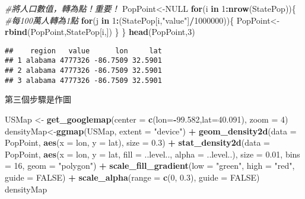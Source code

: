 \documentclass[
]{book}
\newenvironment{Shaded}{\begin{snugshade}}{\end{snugshade}}
\newcommand{\CommentTok}[1]{\textcolor[rgb]{0.56,0.35,0.01}{\textit{#1}}}
\newcommand{\ControlFlowTok}[1]{\textcolor[rgb]{0.13,0.29,0.53}{\textbf{#1}}}
\newcommand{\DataTypeTok}[1]{\textcolor[rgb]{0.13,0.29,0.53}{#1}}
\newcommand{\DecValTok}[1]{\textcolor[rgb]{0.00,0.00,0.81}{#1}}
\newcommand{\FloatTok}[1]{\textcolor[rgb]{0.00,0.00,0.81}{#1}}
\newcommand{\KeywordTok}[1]{\textcolor[rgb]{0.13,0.29,0.53}{\textbf{#1}}}
\newcommand{\NormalTok}[1]{#1}
\newcommand{\OperatorTok}[1]{\textcolor[rgb]{0.81,0.36,0.00}{\textbf{#1}}}
\newcommand{\OtherTok}[1]{\textcolor[rgb]{0.56,0.35,0.01}{#1}}
\newcommand{\StringTok}[1]{\textcolor[rgb]{0.31,0.60,0.02}{#1}}
\begin{document}
\begin{Shaded}
\begin{Highlighting}[]
\CommentTok{#將人口數值，轉為點！重要！}
\NormalTok{PopPoint<-}\OtherTok{NULL} 
\ControlFlowTok{for}\NormalTok{(i }\ControlFlowTok{in} \DecValTok{1}\OperatorTok{:}\KeywordTok{nrow}\NormalTok{(StatePop))\{}
    \CommentTok{#每100萬人轉為1點}
    \ControlFlowTok{for}\NormalTok{(j }\ControlFlowTok{in} \DecValTok{1}\OperatorTok{:}\NormalTok{(StatePop[i,}\StringTok{"value"}\NormalTok{]}\OperatorTok{/}\DecValTok{1000000}\NormalTok{))\{}
\NormalTok{        PopPoint<-}\KeywordTok{rbind}\NormalTok{(PopPoint,StatePop[i,])   }
\NormalTok{    \}}
\NormalTok{\}}
\KeywordTok{head}\NormalTok{(PopPoint,}\DecValTok{3}\NormalTok{)}
\end{Highlighting}
\end{Shaded}

\begin{verbatim}
##    region   value      lon     lat
## 1 alabama 4777326 -86.7509 32.5901
## 2 alabama 4777326 -86.7509 32.5901
## 3 alabama 4777326 -86.7509 32.5901
\end{verbatim}

第三個步驟是作圖

\begin{Shaded}
\begin{Highlighting}[]
\NormalTok{USMap <-}\StringTok{ }\KeywordTok{get_googlemap}\NormalTok{(}\DataTypeTok{center =} \KeywordTok{c}\NormalTok{(}\DataTypeTok{lon=}\OperatorTok{-}\FloatTok{99.582}\NormalTok{,}\DataTypeTok{lat=}\FloatTok{40.091}\NormalTok{), }\DataTypeTok{zoom =} \DecValTok{4}\NormalTok{)}
\NormalTok{densityMap<-}\KeywordTok{ggmap}\NormalTok{(USMap, }\DataTypeTok{extent =} \StringTok{"device"}\NormalTok{) }\OperatorTok{+}\StringTok{ }
\StringTok{    }\KeywordTok{geom_density2d}\NormalTok{(}\DataTypeTok{data =}\NormalTok{ PopPoint, }\KeywordTok{aes}\NormalTok{(}\DataTypeTok{x =}\NormalTok{ lon, }\DataTypeTok{y =}\NormalTok{ lat), }\DataTypeTok{size =} \FloatTok{0.3}\NormalTok{) }\OperatorTok{+}\StringTok{ }
\StringTok{    }\KeywordTok{stat_density2d}\NormalTok{(}\DataTypeTok{data =}\NormalTok{ PopPoint, }
            \KeywordTok{aes}\NormalTok{(}\DataTypeTok{x =}\NormalTok{ lon, }\DataTypeTok{y =}\NormalTok{ lat, }\DataTypeTok{fill =}\NormalTok{ ..level.., }\DataTypeTok{alpha =}\NormalTok{ ..level..), }
                \DataTypeTok{size =} \FloatTok{0.01}\NormalTok{, }\DataTypeTok{bins =} \DecValTok{16}\NormalTok{, }\DataTypeTok{geom =} \StringTok{"polygon"}\NormalTok{) }\OperatorTok{+}\StringTok{ }
\StringTok{    }\KeywordTok{scale_fill_gradient}\NormalTok{(}\DataTypeTok{low =} \StringTok{"green"}\NormalTok{, }\DataTypeTok{high =} \StringTok{"red"}\NormalTok{, }\DataTypeTok{guide =} \OtherTok{FALSE}\NormalTok{) }\OperatorTok{+}\StringTok{ }
\StringTok{    }\KeywordTok{scale_alpha}\NormalTok{(}\DataTypeTok{range =} \KeywordTok{c}\NormalTok{(}\DecValTok{0}\NormalTok{, }\FloatTok{0.3}\NormalTok{), }\DataTypeTok{guide =} \OtherTok{FALSE}\NormalTok{)}
\NormalTok{densityMap}
\end{Highlighting}
\end{Shaded}
\end{document}
